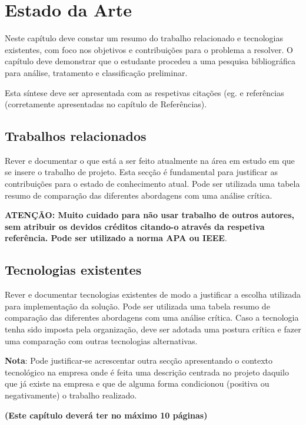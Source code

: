 % 
\chapter{Estado da Arte} %
\label{cap:estado_da_arte} %

Neste capítulo deve constar um resumo do trabalho relacionado e tecnologias existentes, com foco nos objetivos e contribuições para o problema a resolver. O capítulo deve demonstrar que o estudante procedeu a uma pesquisa bibliográfica para análise, tratamento e classificação preliminar. 

Esta síntese deve ser apresentada com as respetivas citações (eg. \cite{Reference1} e referências (corretamente apresentadas no capítulo de Referências). 



\section{Trabalhos relacionados} 
\label{sec:trabalhos_relacionados}
 
Rever e documentar o que está a ser feito atualmente na área em estudo em que se insere o trabalho de projeto. Esta secção é fundamental para justificar as contribuições para o estado de conhecimento atual. Pode ser utilizada uma tabela resumo de comparação das diferentes abordagens com uma análise crítica.


\textbf{ATENÇÃO: Muito cuidado para não usar trabalho de outros autores, sem atribuir os devidos créditos citando-o através da respetiva referência. Pode ser utilizado a norma APA ou IEEE}.



\section{Tecnologias existentes} 
\label{sec:tecnologias_existentes}
 
Rever e documentar tecnologias existentes de modo a justificar a escolha utilizada para implementação da solução. Pode ser utilizada uma tabela resumo de comparação das diferentes abordagens com uma análise crítica. Caso a tecnologia tenha sido imposta pela organização, deve ser adotada uma postura crítica e fazer uma comparação com outras tecnologias alternativas.


\textbf{Nota}: Pode justificar-se acrescentar outra secção apresentando o contexto tecnológico na empresa onde é feita uma descrição centrada no projeto daquilo que já existe na empresa e que de alguma forma condicionou (positiva ou negativamente) o trabalho realizado.

\vspace{20mm} 

\textbf{(Este capítulo deverá ter no máximo 10 páginas)}

